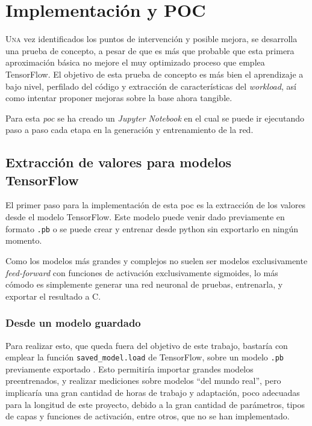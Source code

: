 \chapter{Implementación y POC}
\label{chap:implementacion_poc}

\lettrine{U}{na} vez identificados los puntos de intervención y posible mejora, se desarrolla una prueba de concepto, a pesar de que es más que probable que esta primera aproximación básica no mejore el muy optimizado proceso que emplea TensorFlow. El objetivo de esta prueba de concepto es más bien el aprendizaje a bajo nivel, perfilado del código y extracción de características del \textit{workload}, así como intentar proponer mejoras sobre la base ahora tangible.

Para esta \textit{\acrlong{poc}} se ha creado un \textit{Jupyter Notebook} en el cual se puede ir ejecutando paso a paso cada etapa en la generación y entrenamiento de la red. 

\section{Extracción de valores para modelos TensorFlow}
\label{sec:extraccion_valores_modelo_tf}
El primer paso para la implementación de esta \acrshort{poc} es la extracción de los valores desde el modelo TensorFlow. Este modelo puede venir dado previamente en formato \texttt{.pb} o se puede crear y entrenar desde python sin exportarlo en ningún momento.

Como los modelos más grandes y complejos no suelen ser modelos exclusivamente \textit{feed-forward} con funciones de activación exclusivamente sigmoides, lo más cómodo es simplemente generar una red neuronal de pruebas, entrenarla, y exportar el resultado a C.

\subsection{Desde un modelo guardado}
\label{ssec:desde_modelo_guardado}
Para realizar esto, que queda fuera del objetivo de este trabajo, bastaría con emplear la función \texttt{saved\_model.load} de TensorFlow, sobre un modelo \texttt{.pb} previamente exportado \cite{tensorflow_saved_model}. Esto permitiría importar grandes modelos preentrenados, y realizar mediciones sobre modelos ``del mundo real'', pero implicaría una gran cantidad de horas de trabajo y adaptación, poco adecuadas para la longitud de este proyecto, debido a la gran cantidad de parámetros, tipos de capas y funciones de activación, entre otros, que no se han implementado.

